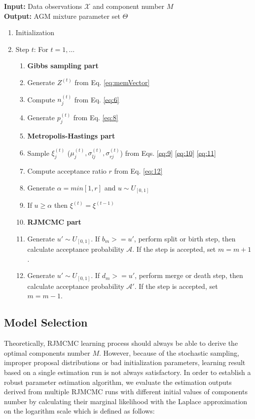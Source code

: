 \noindent\textbf{Input:} Data observations $\mathcal{X}$ and component number $M$ \\
\textbf{Output:} AGM mixture parameter set $\Theta$
\begin{enumerate}
\item Initialization
\item Step $t$: For $t = 1,\ldots$
\begin{enumerate}
\item[]\textbf{Gibbs sampling part}
\item Generate $Z^{(t)}$ from Eq. \eqref{eq:memVector}
\item Compute $n_j^{(t)}$ from Eq. \eqref{eq:6}
\item Generate $p_j^{(t)}$ from Eq. \eqref{eq:8}
\item[] \textbf{Metropolis-Hastings part}
\item Sample $\xi_j^{(t)}$ ($\mu_j^{(t)}, \sigma_{lj}^{(t)}, \sigma_{rj}^{(t)}$) from Eqs. \eqref{eq:9} \eqref{eq:10} \eqref{eq:11}
\item Compute acceptance ratio $r$ from Eq. \eqref{eq:12}
\item Generate $\alpha = min[1,r]$ and $u \sim U_{[0,1]}$
\item If $u \geq \alpha$ then $\xi^{(t)} = \xi^{(t-1)}$
\item[] \textbf{RJMCMC part}
\item Generate $u' \sim U_{[0,1]}$. If $b_m>=u'$, perform split or birth step, then calculate acceptance probability $\mathcal{A}$. If the step is accepted, set $m=m+1$.
\item Generate $u' \sim U_{[0,1]}$. If $d_m>=u'$, perform merge or death step, then calculate acceptance probability $\mathcal{A}'$. If the step is accepted, set $m=m-1$.
\end{enumerate}
\end{enumerate}

\subsection{Model Selection}
\label{sec:2.4}
Theoretically, RJMCMC learning process should always be able to derive the optimal components number $M$. However, because of the stochastic sampling, improper proposal distributions or bad initialization parameters, learning result based on a single estimation run is not always satisfactory. In order to establish a robust parameter estimation algorithm, we evaluate the estimation outputs derived from multiple RJMCMC runs with different initial values of components number by calculating their marginal likelihood with the Laplace approximation \cite{Bouguila2009} on the logarithm scale which is defined as follows:

